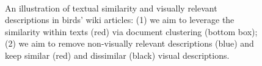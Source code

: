 \documentclass[11pt,a4paper]{article}
\newcommand\gal[1]{\textcolor{bright}{\textbf{GAL:} #1 }}
\newcommand\yuval[1]{\textcolor{darkpink}{\textbf{YUVAL:} #1 }}
\newcommand\tzuf[1]{\textcolor{blue}{\textbf{TZUF:} #1 }}
\begin{document}
\begin{figure}[H]
\centering
{}
 \caption{An illustration of textual similarity and visually relevant descriptions in birds' wiki articles: (1) we aim to leverage the similarity within %
 texts (red) via document clustering (bottom box);
 (2) we aim to remove non-visually relevant descriptions (blue) and keep similar (red) and dissimilar (black) visual descriptions. %
 }\ %
\label{fig:bird_example}%
\end{figure}
\end{document}
